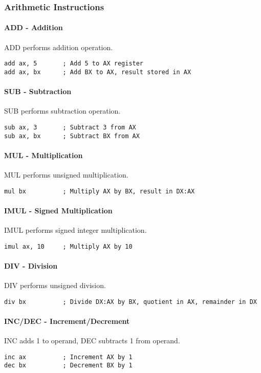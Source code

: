 \documentclass[12pt,a4paper]{article}
\begin{document}
\subsubsection{Arithmetic Instructions}

\paragraph{ADD - Addition}
ADD performs addition operation.
\begin{lstlisting}
add ax, 5       ; Add 5 to AX register
add ax, bx      ; Add BX to AX, result stored in AX
\end{lstlisting}

\paragraph{SUB - Subtraction}
SUB performs subtraction operation.
\begin{lstlisting}
sub ax, 3       ; Subtract 3 from AX
sub ax, bx      ; Subtract BX from AX
\end{lstlisting}

\paragraph{MUL - Multiplication}
MUL performs unsigned multiplication.
\begin{lstlisting}
mul bx          ; Multiply AX by BX, result in DX:AX
\end{lstlisting}

\paragraph{IMUL - Signed Multiplication}
IMUL performs signed integer multiplication.
\begin{lstlisting}
imul ax, 10     ; Multiply AX by 10
\end{lstlisting}

\paragraph{DIV - Division}
DIV performs unsigned division.
\begin{lstlisting}
div bx          ; Divide DX:AX by BX, quotient in AX, remainder in DX
\end{lstlisting}

\paragraph{INC/DEC - Increment/Decrement}
INC adds 1 to operand, DEC subtracts 1 from operand.
\begin{lstlisting}
inc ax          ; Increment AX by 1
dec bx          ; Decrement BX by 1
\end{lstlisting}
\end{document}
